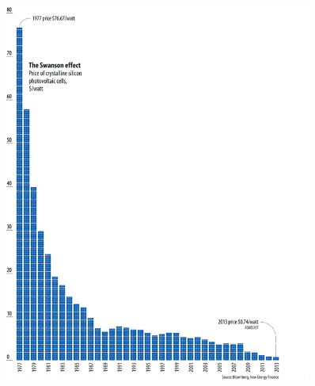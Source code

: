 \begin{figure}[h!]
  \centering
    \includegraphics[width=0.9\textwidth]{figures/Si_cost.jpg}
    \caption{}
  \label{Si_cost}
\end{figure}


